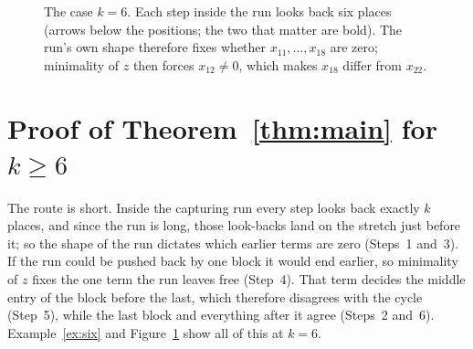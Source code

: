 \documentclass[11pt]{amsart}
\theoremstyle{definition}
\begin{document}
\begin{figure}[ht]
\centering
{}
\caption{The case $k=6$. Each step inside the run looks back six places (arrows below the positions; the two that matter are bold). The
run's own shape therefore fixes whether $x_{11},\dots,x_{18}$ are zero; minimality of $z$ then forces
$x_{12}\neq0$, which makes $x_{18}$ differ from $x_{22}$.}
\label{fig:look}
\end{figure}

\section{Proof of Theorem~\ref{thm:main} for $k\ge6$}\label{sec:proof}

The route is short. Inside the capturing run every step looks back exactly $k$ places, and since the run is
long, those look-backs land on the stretch just before it; so the shape of the run dictates which earlier
terms are zero (Steps~1 and~3). If the run could be pushed back by one block it would end earlier, so
minimality of $z$ fixes the one term the run leaves free (Step~4). That term decides the middle entry of the
block before the last, which therefore disagrees with the cycle (Step~5), while the last block and everything
after it agree (Steps~2 and~6). Example~\ref{ex:six} and Figure~\ref{fig:look} show all of this at $k=6$.
\end{document}
